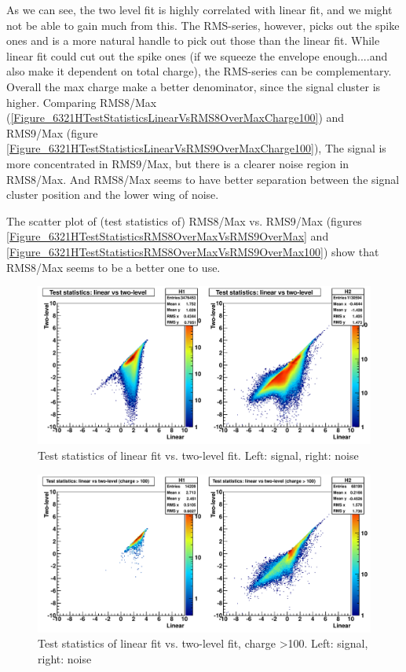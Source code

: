 As we can see, the two level fit is highly correlated with linear fit, and we might not be able to gain much from this.
The RMS-series, however, picks out the spike ones and is a more natural handle to pick out those than the linear fit.
While linear fit could cut out the spike ones (if we squeeze the envelope enough....and also make it dependent on total charge),
the RMS-series can be complementary.
Overall the max charge make a better denominator, since the signal cluster is higher.
Comparing RMS8/Max (\ref{Figure_6321HTestStatisticsLinearVsRMS8OverMaxCharge100}) and RMS9/Max (figure \ref{Figure_6321HTestStatisticsLinearVsRMS9OverMaxCharge100}),
The signal is more concentrated in RMS9/Max, but there is a clearer noise region in RMS8/Max.
And RMS8/Max seems to have better separation between the signal cluster position and the lower wing of noise.

The scatter plot of (test statistics of) RMS8/Max vs. RMS9/Max (figures \ref{Figure_6321HTestStatisticsRMS8OverMaxVsRMS9OverMax} and
\ref{Figure_6321HTestStatisticsRMS8OverMaxVsRMS9OverMax100}) show that RMS8/Max seems to be a better one to use.

\begin{figure}[h]
\includegraphics[width=120mm]{DailyLog/6321/6321HTestStatisticsLinearVsTwoLevel.pdf}
\caption{Test statistics of linear fit vs. two-level fit.  Left: signal, right: noise}
\label{Figure_6321HTestStatisticsLinearVsTwoLevel}
\end{figure}

\begin{figure}
\includegraphics[width=120mm]{DailyLog/6321/6321HTestStatisticsLinearVsTwoLevel100.pdf}
\caption{Test statistics of linear fit vs. two-level fit, charge \textgreater 100.  Left: signal, right: noise}
\label{Figure_6321HTestStatisticsLinearVsTwoLevel100}
\end{figure}

